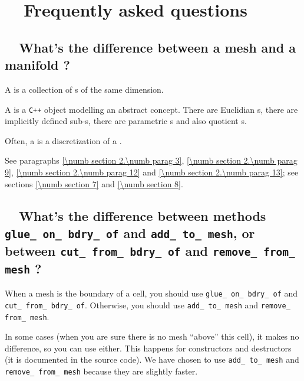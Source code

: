 
\chapter {~~{Frequently asked questions}}\label{\numb section 13}

\section{~~What's the difference between a mesh and a manifold ?}
\label{\numb section 13.\numb parag 1}

A {\small\tt{}} is a collection of {\small\tt{}}s of the
same dimension.

A {\small\tt{}} is a {\tt C++} object modelling an abstract concept.
There are Euclidian {\small\tt{}}s, there are implicitly defined
sub-{\small\tt{}}s, there are parametric {\small\tt{}}s
and also quotient {\small\tt{}}s.

Often, a {\small\tt{}} is a discretization of a {\small\tt{}}.

See paragraphs \ref{\numb section 2.\numb parag 3}, \ref{\numb section 2.\numb parag 9},
\ref{\numb section 2.\numb parag 12} and \ref{\numb section 2.\numb parag 13};
see sections \ref{\numb section 7} and \ref{\numb section 8}.


\section{~~What's the difference between methods {\small\tt glue\_\,on\_\,bdry\_\,of} and
  {\small\tt add\_\,to\_\,mesh}, or between {\small\tt cut\_\,from\_\,bdry\_\,of} and
  {\small\tt remove\_\,from\_\,mesh} ?}
\label{\numb section 13.\numb parag 2}

When a mesh is the boundary of a cell, you should use {\small\tt glue\_\,on\_\,bdry\_\,of} and
{\small\tt cut\_\,from\_\,bdry\_\,of}.
Otherwise, you should use {\small\tt add\_\,to\_\,mesh} and {\small\tt remove\_\,from\_\,mesh}.

In some cases (when you are sure there is no mesh ``above'' this cell), it makes no difference,
so you can use either.
This happens for {\small\tt{}} constructors and destructors
(it is documented in the source code).
We have chosen to use {\small\tt add\_\,to\_\,mesh} and {\small\tt remove\_\,from\_\,mesh}
because they are slightly faster.
